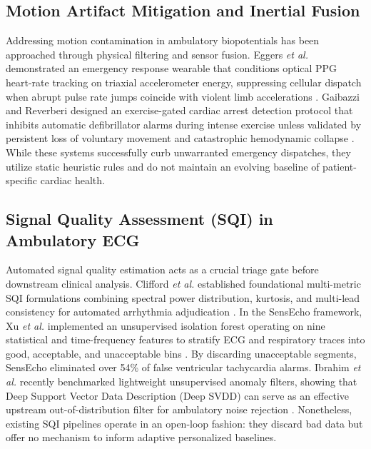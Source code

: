 \documentclass{ieeeaccess}
\begin{document}
\subsection{Motion Artifact Mitigation and Inertial Fusion}
Addressing motion contamination in ambulatory biopotentials has been approached through physical filtering and sensor fusion. Eggers \textit{et al.} demonstrated an emergency response wearable that conditions optical PPG heart-rate tracking on triaxial accelerometer energy, suppressing cellular dispatch when abrupt pulse rate jumps coincide with violent limb accelerations \cite{ref:eggers}. Gaibazzi and Reverberi designed an exercise-gated cardiac arrest detection protocol that inhibits automatic defibrillator alarms during intense exercise unless validated by persistent loss of voluntary movement and catastrophic hemodynamic collapse \cite{ref:gaibazzi}. While these systems successfully curb unwarranted emergency dispatches, they utilize static heuristic rules and do not maintain an evolving baseline of patient-specific cardiac health.

\subsection{Signal Quality Assessment (SQI) in Ambulatory ECG}
Automated signal quality estimation acts as a crucial triage gate before downstream clinical analysis. Clifford \textit{et al.} established foundational multi-metric SQI formulations combining spectral power distribution, kurtosis, and multi-lead consistency for automated arrhythmia adjudication \cite{ref:wesad}. In the SensEcho framework, Xu \textit{et al.} implemented an unsupervised isolation forest operating on nine statistical and time-frequency features to stratify ECG and respiratory traces into good, acceptable, and unacceptable bins \cite{ref:senecho}. By discarding unacceptable segments, SensEcho eliminated over 54\% of false ventricular tachycardia alarms. Ibrahim \textit{et al.} recently benchmarked lightweight unsupervised anomaly filters, showing that Deep Support Vector Data Description (Deep SVDD) can serve as an effective upstream out-of-distribution filter for ambulatory noise rejection \cite{ref:svdd}. Nonetheless, existing SQI pipelines operate in an open-loop fashion: they discard bad data but offer no mechanism to inform adaptive personalized baselines.
\end{document}
